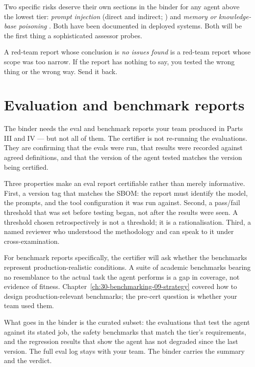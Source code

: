 Two specific risks deserve their own sections in the binder for any agent above the lowest tier: \textit{prompt injection} (direct and indirect; \citealp{greshake2023promptinj}) and \textit{memory or knowledge-base poisoning} \citep{chen2024memorypoison}. Both have been documented in deployed systems. Both will be the first thing a sophisticated assessor probes.

\begin{TNwarning} A red-team report whose conclusion is \textit{no issues found} is a red-team report whose scope was too narrow. If the report has nothing to say, you tested the wrong thing or the wrong way. Send it back. \end{TNwarning}

\section{Evaluation and benchmark reports}

The binder needs the eval and benchmark reports your team produced in Parts III and IV --- but not all of them. The certifier is not re-running the evaluations. They are confirming that the evals were run, that results were recorded against agreed definitions, and that the version of the agent tested matches the version being certified.

Three properties make an eval report certifiable rather than merely informative. First, a version tag that matches the SBOM: the report must identify the model, the prompts, and the tool configuration it was run against. Second, a pass/fail threshold that was set before testing began, not after the results were seen. A threshold chosen retrospectively is not a threshold; it is a rationalisation. Third, a named reviewer who understood the methodology and can speak to it under cross-examination.

For benchmark reports specifically, the certifier will ask whether the benchmarks represent production-realistic conditions. A suite of academic benchmarks bearing no resemblance to the actual task the agent performs is a gap in coverage, not evidence of fitness. Chapter~\ref{ch:30-benchmarking-09-strategy} covered how to design production-relevant benchmarks; the pre-cert question is whether your team used them.

What goes in the binder is the curated subset: the evaluations that test the agent against its stated job, the safety benchmarks that match the tier's requirements, and the regression results that show the agent has not degraded since the last version. The full eval log stays with your team. The binder carries the summary and the verdict.

